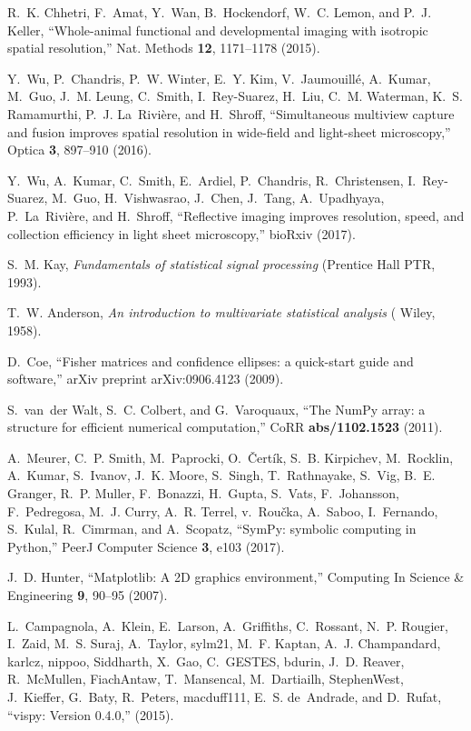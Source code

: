 \documentclass[10pt]{article}
\begin{document}
\begin{thebibliography}{10}
R.~K. Chhetri, F.~Amat, Y.~Wan, B.~Hockendorf, W.~C. Lemon, and P.~J. Keller,
  \enquote{Whole-animal functional and developmental imaging with isotropic
  spatial resolution,} Nat. Methods \textbf{12}, 1171--1178 (2015).

Y.~Wu, P.~Chandris, P.~W. Winter, E.~Y. Kim, V.~Jaumouill{\'e}, A.~Kumar,
  M.~Guo, J.~M. Leung, C.~Smith, I.~Rey-Suarez, H.~Liu, C.~M. Waterman, K.~S.
  Ramamurthi, P.~J. La~Rivi\`ere, and H.~Shroff, \enquote{Simultaneous
  multiview capture and fusion improves spatial resolution in wide-field and
  light-sheet microscopy,} Optica \textbf{3}, 897--910 (2016).

Y.~Wu, A.~Kumar, C.~Smith, E.~Ardiel, P.~Chandris, R.~Christensen,
  I.~Rey-Suarez, M.~Guo, H.~Vishwasrao, J.~Chen, J.~Tang, A.~Upadhyaya,
  P.~La~Rivi\`ere, and H.~Shroff, \enquote{Reflective imaging improves
  resolution, speed, and collection efficiency in light sheet microscopy,}
  bioRxiv  (2017).

S.~M. Kay, \emph{Fundamentals of statistical signal processing} (Prentice Hall
  PTR, 1993).

  T.~W. Anderson, \emph{An introduction to multivariate statistical analysis}
(\hypertarget{wiley}{{\color{urlblue}
Wiley}}, 1958).

D.~Coe, \enquote{Fisher matrices and confidence ellipses: a quick-start guide
  and software,} arXiv preprint arXiv:0906.4123  (2009).

S.~van~der Walt, S.~C. Colbert, and G.~Varoquaux, \enquote{The {N}um{P}y array:
  a structure for efficient numerical computation,} CoRR \textbf{abs/1102.1523}
  (2011).

A.~Meurer, C.~P. Smith, M.~Paprocki, O.~\v{C}ert\'{i}k, S.~B. Kirpichev,
  M.~Rocklin, A.~Kumar, S.~Ivanov, J.~K. Moore, S.~Singh, T.~Rathnayake,
  S.~Vig, B.~E. Granger, R.~P. Muller, F.~Bonazzi, H.~Gupta, S.~Vats,
  F.~Johansson, F.~Pedregosa, M.~J. Curry, A.~R. Terrel, v.~Rou\v{c}ka,
  A.~Saboo, I.~Fernando, S.~Kulal, R.~Cimrman, and A.~Scopatz,
  \enquote{Sym{P}y: symbolic computing in {P}ython,} PeerJ Computer Science
  \textbf{3}, e103 (2017).

J.~D. Hunter, \enquote{Matplotlib: A {2D} graphics environment,} Computing In
  Science \& Engineering \textbf{9}, 90--95 (2007).

L.~Campagnola, A.~Klein, E.~Larson, A.~Griffiths, C.~Rossant, N.~P. Rougier,
  I.~Zaid, M.~S. Suraj, A.~Taylor, sylm21, M.~F. Kaptan, A.~J. Champandard,
  karlcz, nippoo, Siddharth, X.~Gao, C.~GESTES, bdurin, J.~D. Reaver,
  R.~McMullen, FiachAntaw, T.~Mansencal, M.~Dartiailh, StephenWest, J.~Kieffer,
  G.~Baty, R.~Peters, macduff111, E.~S. de~Andrade, and D.~Rufat,
  \enquote{vispy: Version 0.4.0,}  (2015).


\end{thebibliography}
\end{document}
